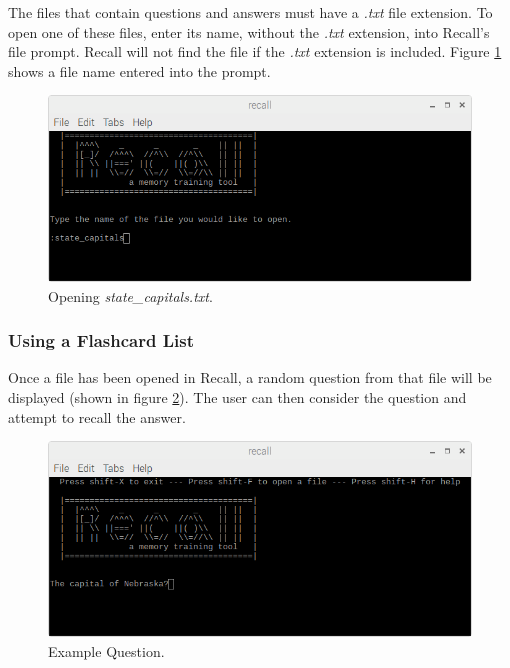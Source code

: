 \documentclass[letterpaper]{article}
\begin{document}
The files that contain questions and answers must have a \textit{.txt} file extension. To open one of these files, enter its name, without the \textit{.txt} extension, into Recall's file prompt. Recall will not find the file if the \textit{.txt} extension is included. Figure \ref{fig:entering_file_name} shows a file name entered into the prompt.

\begin{figure}[H]
  \centering
  \includegraphics[width=14cm]{images/running/entered_file.png}
  \caption{Opening \textit{state\_capitals.txt}.}
  \label{fig:entering_file_name}
\end{figure}

\subsubsection{Using a Flashcard List}
Once a file has been opened in Recall, a random question from that file will be displayed (shown in figure \ref{fig:example_questian_1}). The user can then consider the question and attempt to recall the answer.

\begin{figure}[H]
  \centering
  \includegraphics[width=14cm]{images/running/questian1.png}
  \caption{Example Question.}
  \label{fig:example_questian_1}
\end{figure}
\end{document}
